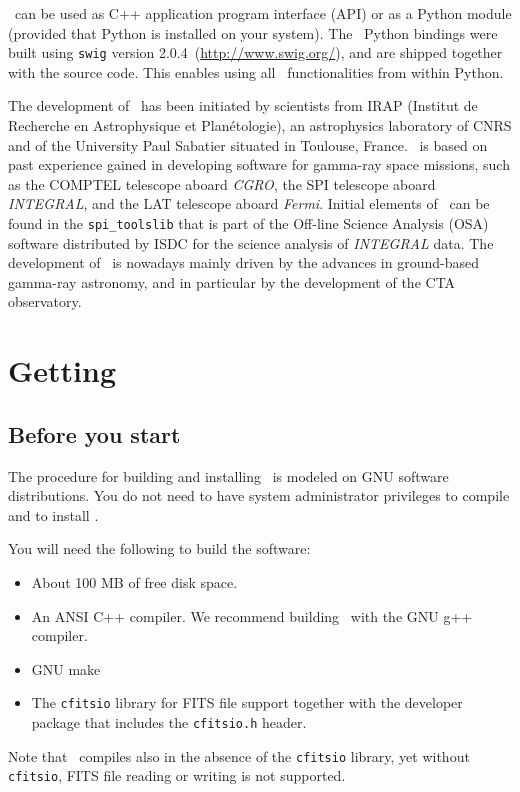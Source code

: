 \documentclass{article}[12pt,a4]
\newcommand{\swigversion}{\mbox{2.0.4}}
\begin{document}
\this\ can be used as C++ application program interface (API) or as a Python module (provided
that Python is installed on your system).
The \this\ Python bindings were built using 
{\tt swig} version \swigversion\ (\url{http://www.swig.org/}), and are shipped together with the
source code.
This enables using all \this\ functionalities from within Python.

The development of \this\ has been initiated by scientists from IRAP (Institut de Recherche
en Astrophysique et Plan\'etologie), an astrophysics laboratory of CNRS and of the University
Paul Sabatier situated in Toulouse, France.
\this\ is based on past experience gained in developing software for gamma-ray space
missions, such as
the COMPTEL telescope aboard {\em CGRO}, 
the SPI telescope aboard {\em INTEGRAL},
and the LAT telescope aboard {\em Fermi}.
Initial elements of \this\ can be found in the {\tt spi\_toolslib} that is part of the
Off-line Science Analysis (OSA) software distributed by ISDC for the science analysis 
of {\em INTEGRAL} data.
The development of \this\ is nowadays mainly driven by the advances in 
ground-based gamma-ray astronomy, and in particular by the development of the
CTA observatory.


\clearpage
\section{Getting \this}

\subsection{Before you start}

The procedure for building and installing \this\ is modeled on GNU software distributions.
You do not need to have system administrator privileges to compile and to install \this.

You will need the following to build the software:
\begin{itemize}
\item About 100 MB of free disk space.
\item An ANSI C++ compiler. We recommend building \this\ with the GNU g++ compiler.
\item GNU make
\item The {\tt cfitsio} library for FITS file support together with the developer package that 
includes the {\tt cfitsio.h} header.
\end{itemize}
Note that \this\ compiles also in the absence of the {\tt cfitsio} library, yet without {\tt cfitsio},
FITS file reading or writing is not supported.
\end{document}
